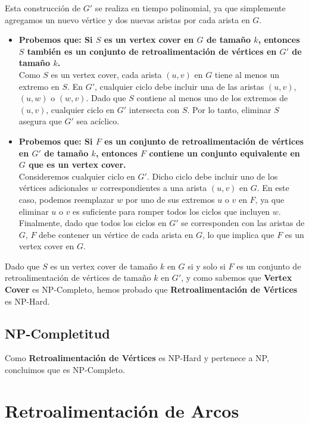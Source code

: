 \documentclass[a4paper,12pt]{article}
\begin{document}
Esta construcci\'on de $G'$ se realiza en tiempo polinomial, ya que simplemente agregamos un nuevo v\'ertice y dos nuevas aristas por cada arista en $G$.

\begin{itemize}
    \item \textbf{Probemos que: Si $S$ es un vertex cover en $G$ de tama\~no $k$, entonces $S$ tambi\'en es un conjunto de retroalimentaci\'on de v\'ertices en $G'$ de tama\~no $k$.}\\
    Como $S$ es un vertex cover, cada arista $(u, v)$ en $G$ tiene al menos un extremo en $S$. En $G'$, cualquier ciclo debe incluir una de las aristas $(u, v)$, $(u, w)$ o $(w, v)$. Dado que $S$ contiene al menos uno de los extremos de $(u, v)$, cualquier ciclo en $G'$ intersecta con $S$. Por lo tanto, eliminar $S$ asegura que $G'$ sea ac\'iclico.

    \item \textbf{Probemos que: Si $F$ es un conjunto de retroalimentaci\'on de v\'ertices en $G'$ de tama\~no $k$, entonces $F$ contiene un conjunto equivalente en $G$ que es un vertex cover.}\\
    Consideremos cualquier ciclo en $G'$. Dicho ciclo debe incluir uno de los v\'ertices adicionales $w$ correspondientes a una arista $(u, v)$ en $G$. En este caso, podemos reemplazar $w$ por uno de sus extremos $u$ o $v$ en $F$, ya que eliminar $u$ o $v$ es suficiente para romper todos los ciclos que incluyen $w$. Finalmente, dado que todos los ciclos en $G'$ se corresponden con las aristas de $G$, $F$ debe contener un v\'ertice de cada arista en $G$, lo que implica que $F$ es un vertex cover en $G$.
\end{itemize}

Dado que $S$ es un vertex cover de tama\~no $k$ en $G$ si y solo si $F$ es un conjunto de retroalimentaci\'on de v\'ertices de tama\~no $k$ en $G'$, y como sabemos que \textbf{Vertex Cover} es NP-Completo, hemos probado que \textbf{Retroalimentaci\'on de V\'ertices} es NP-Hard.

\subsection{NP-Completitud}

Como \textbf{Retroalimentaci\'on de V\'ertices} es NP-Hard y pertenece a NP, concluimos que es NP-Completo.




\section{Retroalimentaci\'on de Arcos}
\end{document}
